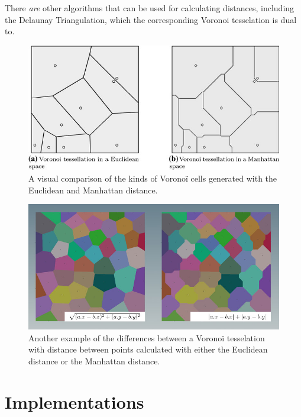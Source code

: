There \textit{are} other algorithms that can be used for calculating distances, including the Delaunay Triangulation\cite{baeldungvoronoi}, which the corresponding Voronoi tesselation is dual to.\cite{wolframvoronoi}

\begin{figure}[H]
    \centering
    \includegraphics{Images/Voronoitessellations.jpg}
    \caption{A visual comparison of the kinds of Voronoï cells generated with the Euclidean and Manhattan distance.\cite{reffortesselations}}
    \label{fig:voronoicomparison}
\end{figure}

\begin{figure}[H]
    \centering
    \includegraphics[width=\textwidth]{Images/manhattan_example_02.jpg}
    \caption{Another example of the differences between a Voronoï tesselation with distance between points calculated with either the Euclidean distance or the Manhattan distance.\cite{manvoronoi}}
    \label{fig:secondvoronoicomparison}
\end{figure}

\section{Implementations}

